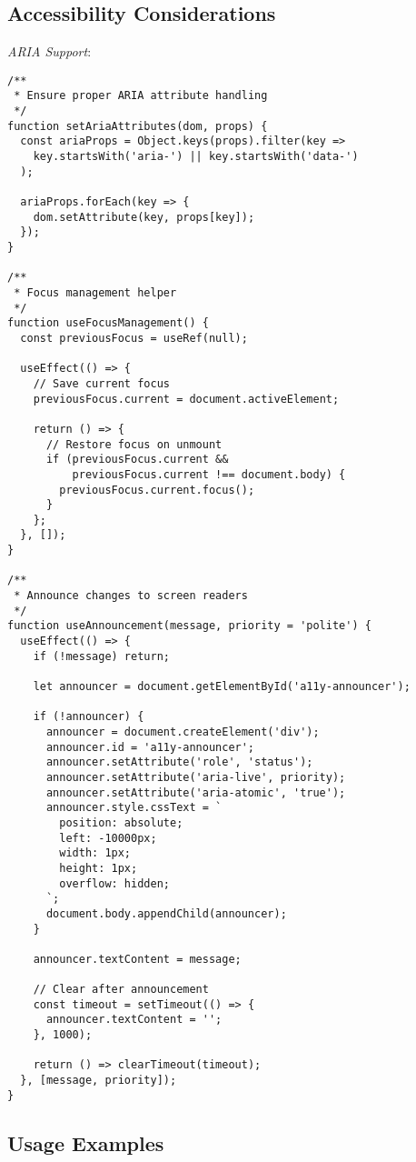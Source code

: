 \documentclass[11pt]{article}
\begin{document}
\subsection{Accessibility Considerations}
\label{sec:org3c6e508}

\emph{ARIA Support}:

\begin{verbatim}
/**
 * Ensure proper ARIA attribute handling
 */
function setAriaAttributes(dom, props) {
  const ariaProps = Object.keys(props).filter(key => 
    key.startsWith('aria-') || key.startsWith('data-')
  );
  
  ariaProps.forEach(key => {
    dom.setAttribute(key, props[key]);
  });
}

/**
 * Focus management helper
 */
function useFocusManagement() {
  const previousFocus = useRef(null);
  
  useEffect(() => {
    // Save current focus
    previousFocus.current = document.activeElement;
    
    return () => {
      // Restore focus on unmount
      if (previousFocus.current && 
          previousFocus.current !== document.body) {
        previousFocus.current.focus();
      }
    };
  }, []);
}

/**
 * Announce changes to screen readers
 */
function useAnnouncement(message, priority = 'polite') {
  useEffect(() => {
    if (!message) return;
    
    let announcer = document.getElementById('a11y-announcer');
    
    if (!announcer) {
      announcer = document.createElement('div');
      announcer.id = 'a11y-announcer';
      announcer.setAttribute('role', 'status');
      announcer.setAttribute('aria-live', priority);
      announcer.setAttribute('aria-atomic', 'true');
      announcer.style.cssText = `
        position: absolute;
        left: -10000px;
        width: 1px;
        height: 1px;
        overflow: hidden;
      `;
      document.body.appendChild(announcer);
    }
    
    announcer.textContent = message;
    
    // Clear after announcement
    const timeout = setTimeout(() => {
      announcer.textContent = '';
    }, 1000);
    
    return () => clearTimeout(timeout);
  }, [message, priority]);
}
\end{verbatim}
\subsection{Usage Examples}
\label{sec:org571c0b1}
\end{document}
